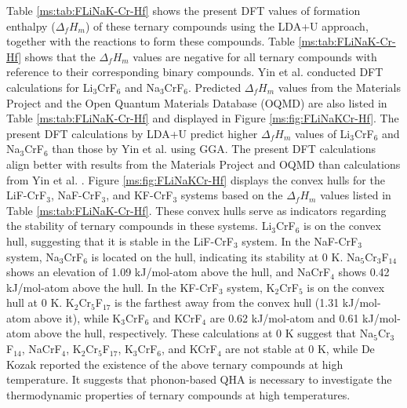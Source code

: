 Table \ref{ms:tab:FLiNaK-Cr-Hf} shows the present DFT values of formation enthalpy ($\Delta_fH_m$) of these ternary compounds using the LDA+U approach, together with the reactions to form these compounds. Table \ref{ms:tab:FLiNaK-Cr-Hf} shows that the $\Delta_fH_m$ values are negative for all ternary compounds with reference to their corresponding binary compounds. Yin et al. \cite{yin2018thermodynamic, yin2014thermodynamic} conducted DFT calculations for Li$_3$CrF$_6$ and Na$_3$CrF$_6$. Predicted $\Delta_fH_m$ values from the Materials Project \cite{jain2013commentary} and the Open Quantum Materials Database (OQMD) \cite{kirklin2015open} are also listed in Table \ref{ms:tab:FLiNaK-Cr-Hf} and displayed in Figure \ref{ms:fig:FLiNaKCr-Hf}. The present DFT calculations by LDA+U predict higher $\Delta_fH_m$ values of Li$_3$CrF$_6$ and Na$_3$CrF$_6$ than those by Yin et al. \cite{yin2018thermodynamic, yin2014thermodynamic} using GGA. The present DFT calculations align better with results from the Materials Project \cite{jain2013commentary} and OQMD \cite{kirklin2015open} than calculations from Yin et al. \cite{yin2018thermodynamic, yin2014thermodynamic}. Figure \ref{ms:fig:FLiNaKCr-Hf} displays the convex hulls for the LiF-CrF$_3$, NaF-CrF$_3$, and KF-CrF$_3$ systems based on the $\Delta_fH_m$ values listed in Table \ref{ms:tab:FLiNaK-Cr-Hf}. These convex hulls serve as indicators regarding the stability of ternary compounds in these systems. Li$_3$CrF$_6$ is on the convex hull, suggesting that it is stable in the LiF-CrF$_3$ system. In the NaF-CrF$_3$ system, Na$_3$CrF$_6$ is located on the hull, indicating its stability at 0 K. Na$_5$Cr$_3$F$_{14}$ shows an elevation of 1.09 kJ/mol-atom above the hull, and NaCrF$_4$ shows 0.42 kJ/mol-atom above the hull. In the KF-CrF$_3$ system, K$_2$CrF$_5$ is on the convex hull at 0 K. K$_2$Cr$_5$F$_{17}$ is the farthest away from the convex hull (1.31 kJ/mol-atom above it), while K$_3$CrF$_6$ and KCrF$_4$ are 0.62 kJ/mol-atom and 0.61 kJ/mol-atom above the hull, respectively. These calculations at 0 K suggest that Na$_5$Cr$_3$F$_{14}$, NaCrF$_4$, K$_2$Cr$_5$F$_{17}$, K$_3$CrF$_6$, and KCrF$_4$ are not stable at 0 K, while De Kozak \cite{DeKozak1969} reported the existence of the above ternary compounds at high temperature. It suggests that phonon-based QHA is necessary to investigate the thermodynamic properties of ternary compounds at high temperatures.

